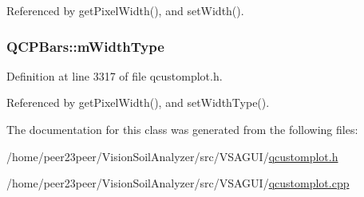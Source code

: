 Referenced by get\+Pixel\+Width(), and set\+Width().

\hypertarget{class_q_c_p_bars_a94dba1309496c7601d01e2c59715cbb3}{}
\subsubsection[{m\+Width\+Type}]{ Q\+C\+P\+Bars\+::m\+Width\+Type\hspace{0.3cm}{\ttfamily [protected]}}\label{class_q_c_p_bars_a94dba1309496c7601d01e2c59715cbb3}


Definition at line 3317 of file qcustomplot.\+h.



Referenced by get\+Pixel\+Width(), and set\+Width\+Type().



The documentation for this class was generated from the following files\+:\begin{DoxyCompactItemize}
\item 
/home/peer23peer/\+Vision\+Soil\+Analyzer/src/\+V\+S\+A\+G\+U\+I/\hyperlink{qcustomplot_8h}{qcustomplot.\+h}\item 
/home/peer23peer/\+Vision\+Soil\+Analyzer/src/\+V\+S\+A\+G\+U\+I/\hyperlink{qcustomplot_8cpp}{qcustomplot.\+cpp}\end{DoxyCompactItemize}
